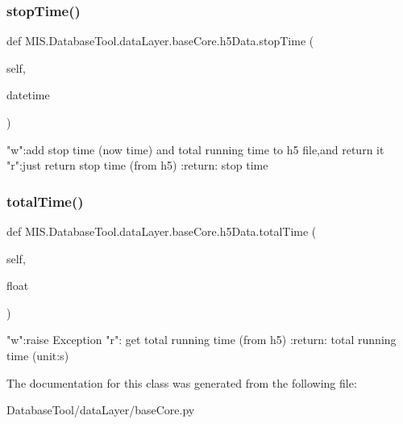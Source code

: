 \subsubsection{\texorpdfstring{stop\+Time()}{stopTime()}}
{\footnotesize\ttfamily def M\+I\+S.\+Database\+Tool.\+data\+Layer.\+base\+Core.\+h5\+Data.\+stop\+Time (\begin{DoxyParamCaption}\item[{}]{self,  }\item[{}]{datetime }\end{DoxyParamCaption})}

\begin{DoxyVerb}"w":add stop time (now time) and total running time to h5 file,and return it
"r":just return stop time (from h5)
:return: stop time
\end{DoxyVerb}
 \mbox{\label{classMIS_1_1DatabaseTool_1_1dataLayer_1_1baseCore_1_1h5Data_a884e40635c5f1b3ade9239523129b337}} 
\subsubsection{\texorpdfstring{total\+Time()}{totalTime()}}
{\footnotesize\ttfamily def M\+I\+S.\+Database\+Tool.\+data\+Layer.\+base\+Core.\+h5\+Data.\+total\+Time (\begin{DoxyParamCaption}\item[{}]{self,  }\item[{}]{float }\end{DoxyParamCaption})}

\begin{DoxyVerb}"w":raise Exception
"r": get total running time (from h5)
:return: total running time (unit:s)
\end{DoxyVerb}
 

The documentation for this class was generated from the following file\+:\begin{DoxyCompactItemize}
\item 
Database\+Tool/data\+Layer/base\+Core.\+py\end{DoxyCompactItemize}
